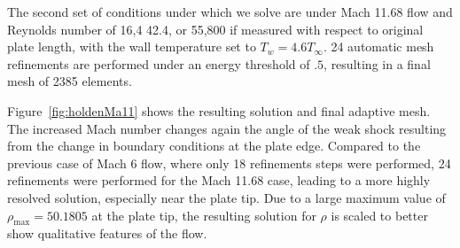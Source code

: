 The second set of conditions under which we solve are under Mach 11.68 flow and Reynolds number of 16,4	42.4, or 55,800 if measured with respect to original plate length, with the wall temperature set to $T_{w} = 4.6T_{\infty}$.  24 automatic mesh refinements are performed under an energy threshold of $.5$, resulting in a final mesh of 2385 elements.  

Figure~\ref{fig:holdenMa11} shows the resulting solution and final adaptive mesh.  The increased Mach number changes again the angle of the weak shock resulting from the change in boundary conditions at the plate edge.  Compared to the previous case of Mach 6 flow, where only 18 refinements steps were performed, 24 refinements were performed for the Mach 11.68 case, leading to a more highly resolved solution, especially near the plate tip.  Due to a large maximum value of $\rho_{\max} = 50.1805$ at the plate tip, the resulting solution for $\rho$ is scaled to better show qualitative features of the flow.  

%

